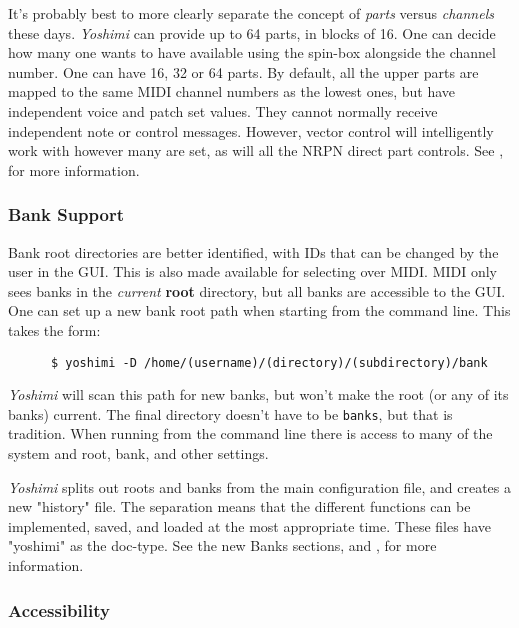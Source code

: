 \documentclass[
 11pt,
 twoside,
 a4paper,
 final                                 %
]{article}
\begin{document}
   It's probably best to more clearly separate the concept of
   \textsl{parts} versus \textsl{channels} these days.
   \textsl{Yoshimi} can provide up to 64 parts, in blocks of 16. One can
   decide how many one wants to have available using the spin-box alongside
   the channel number.  One can have 16, 32 or 64 parts.  By default, all the
   upper parts are mapped to the same MIDI channel numbers as the lowest ones,
   but have independent voice and patch set values. They cannot normally
   receive independent note or control messages. However, vector control will
   intelligently work with however many are set, as will all the NRPN direct
   part controls.
   See , for more information.

\subsubsection{Bank Support}
\label{subsubsec:new_features_bank_support}

   Bank root directories are better identified, with IDs that can be changed by
   the user in the GUI. This is also made available for selecting over MIDI.
   MIDI only sees banks in the \textsl{current}
   \textbf{root} directory, but all banks are accessible to the GUI.
   One can set up a new bank root path when starting from the
   command line. This takes the form:

   \begin{verbatim}
      $ yoshimi -D /home/(username)/(directory)/(subdirectory)/bank
   \end{verbatim}

   \textsl{Yoshimi} will scan this path for new banks, but
   won't make the root (or any of its banks) current. The final directory
   doesn't have to be \texttt{banks}, but that is tradition.
   When running from the command line there is access to many
   of the system and root, bank, and other settings.

   \textsl{Yoshimi} splits out roots and banks from the main configuration
   file, and creates a new "history" file. The separation means that the
   different functions can be implemented, saved, and loaded at the most
   appropriate time. These files have "yoshimi" as the doc-type.
   See the new Banks sections,
   and
   ,
   for more information.

\subsubsection{Accessibility}
\label{subsubsec:new_features_accessibility}
\end{document}
